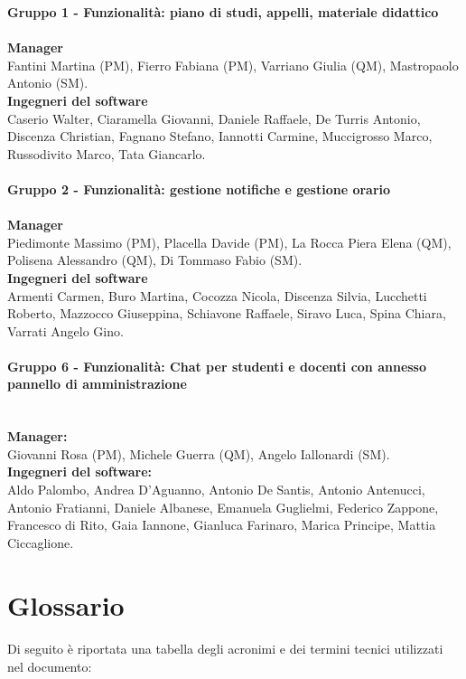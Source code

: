\textbf {Gruppo 1 - Funzionalità: piano di studi, appelli, materiale didattico} \\ \\
\textbf{Manager} \\
Fantini Martina (PM), Fierro Fabiana (PM), Varriano Giulia (QM), Mastropaolo Antonio (SM). \\
\textbf{Ingegneri del software} \\
Caserio Walter, Ciaramella Giovanni, Daniele Raffaele, De Turris Antonio, Discenza Christian, Fagnano Stefano, Iannotti Carmine,  Muccigrosso Marco, Russodivito Marco, Tata Giancarlo.
\\ \\
\textbf {Gruppo 2 - Funzionalità: gestione notifiche e gestione orario} \\ \\
\textbf{Manager} \\
Piedimonte Massimo (PM), Placella Davide (PM), La Rocca Piera Elena (QM), Polisena Alessandro (QM), Di Tommaso Fabio (SM). \\
\textbf{Ingegneri del software} \\
Armenti Carmen, Buro Martina, Cocozza Nicola, Discenza Silvia, Lucchetti Roberto, Mazzocco Giuseppina, Schiavone Raffaele, Siravo Luca, Spina Chiara, Varrati Angelo Gino.

\paragraph{Gruppo 6 - Funzionalità: Chat per studenti e docenti con annesso pannello di amministrazione \\ \\}
\textbf{Manager: \\} 
Giovanni Rosa (PM),
Michele Guerra (QM),
Angelo Iallonardi (SM). \\
\textbf{Ingegneri del software:} \\
Aldo Palombo,
Andrea D'Aguanno,
Antonio De Santis,
Antonio Antenucci,
Antonio Fratianni,
Daniele Albanese,
Emanuela Guglielmi,
Federico Zappone,
Francesco di Rito,
Gaia Iannone,
Gianluca Farinaro,
Marica Principe,
Mattia Ciccaglione.

\section{Glossario}

\paragraph{}
Di seguito è riportata una tabella degli acronimi e dei termini tecnici utilizzati nel documento:

